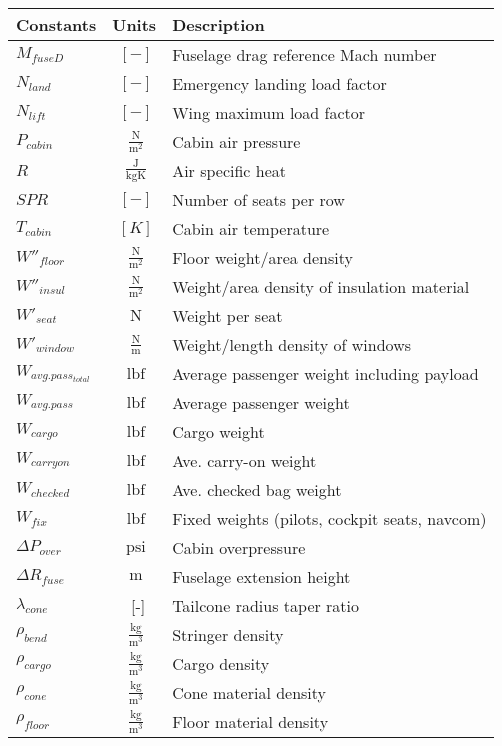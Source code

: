 \documentclass[12pt]{article}
\begin{document}
{\footnotesize
\begin{supertabular}{lcl}
\toprule
Constants & Units & Description \\ \midrule
$M_{fuseD}$ & $~[-]$ & Fuselage drag reference Mach number \\
$N_{land}$ &  $~[-]$  & Emergency landing load factor \\
$N_{lift}$ &  $~[-]$  & Wing maximum load factor \\
$P_{cabin}$ & $~\mathrm{\tfrac{N}{m^{2}}}$ & Cabin air pressure \\
$R$ & $~\mathrm{\tfrac{J}{kgK}}$ & Air specific heat \\
$SPR$ & $~[-]$ & Number of seats per row \\
$T_{cabin}$ & $~[K]$ & Cabin air temperature \\
$W''_{floor}$ & $~\mathrm{\tfrac{N}{m^{2}}}$ & Floor weight/area density \\
$W''_{insul}$ & $~\mathrm{\tfrac{N}{m^{2}}}$ & Weight/area density of insulation material \\
$W'_{seat}$ & $~\mathrm{N}$ & Weight per seat \\
$W'_{window}$ & $~\mathrm{\tfrac{N}{m}}$ & Weight/length density of windows \\
$W_{avg. pass_{total}}$ & $~\mathrm{lbf}$ & Average passenger weight including payload \\
$W_{avg. pass}$ & $~\mathrm{lbf}$ & Average passenger weight \\
$W_{cargo}$ & $~\mathrm{lbf}$ & Cargo weight \\
$W_{carry on}$ & $~\mathrm{lbf}$ & Ave. carry-on weight \\
$W_{checked}$ & $~\mathrm{lbf}$ & Ave. checked bag weight \\
$W_{fix}$ & $~\mathrm{lbf}$ & Fixed weights (pilots, cockpit seats, navcom) \\
$\Delta P_{over}$ & $~\mathrm{psi}$ & Cabin overpressure \\
$\Delta R_{fuse}$ & $~\mathrm{m}$ & Fuselage extension height \\
$\lambda_{cone}$ & $ $~[-]$ $ & Tailcone radius taper ratio \\
$\rho_{bend}$ & $~\mathrm{\tfrac{kg}{m^{3}}}$ & Stringer density \\
$\rho_{cargo}$ & $~\mathrm{\tfrac{kg}{m^{3}}}$ & Cargo density \\
$\rho_{cone}$ & $~\mathrm{\tfrac{kg}{m^{3}}}$ & Cone material density \\
$\rho_{floor}$ & $~\mathrm{\tfrac{kg}{m^{3}}}$ & Floor material density \\

\end{supertabular}}
\end{document}
